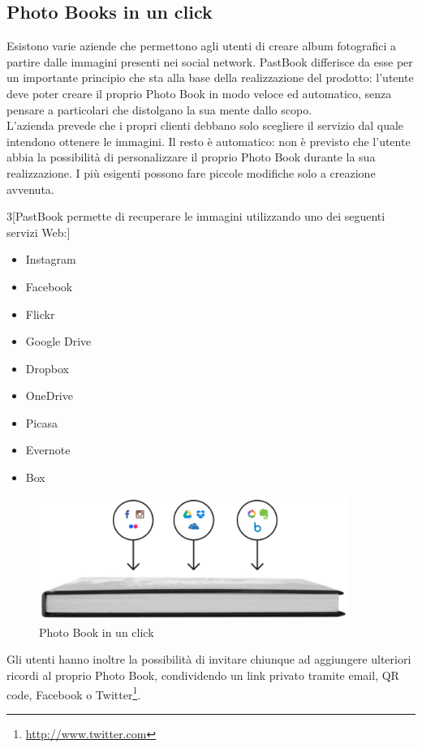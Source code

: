 		\subsection{Photo Books in un click}
			Esistono varie aziende che permettono agli utenti di creare album fotografici a partire dalle immagini presenti nei social
			network. PastBook differisce da esse per un importante principio che sta alla base della realizzazione del prodotto: l'utente
			deve poter creare il proprio Photo Book in modo veloce ed automatico, senza pensare a particolari che distolgano la sua mente
			dallo scopo.\\
			L'azienda prevede che i propri clienti debbano solo scegliere il servizio dal quale intendono ottenere le immagini. Il resto
			è automatico: non è previsto che l'utente abbia la possibilità di personalizzare il proprio Photo Book durante la sua
			realizzazione. I più esigenti possono fare piccole modifiche solo a creazione avvenuta.\\
			\begin{multicols}{3}[\noindent PastBook permette di recuperare le immagini utilizzando uno dei seguenti servizi Web:]
				\begin{itemize}
					\item Instagram
					\item Facebook
					\item Flickr
					\item Google Drive
					\item Dropbox
					\item OneDrive
					\item Picasa
					\item Evernote
					\item Box
				\end{itemize}
			\end{multicols}
			\begin{figure}[H]
				\centering
				\includegraphics[width=0.9\textwidth]{capitolo_1/immagini/photo_book_one_click.png}
				\caption[Photo Book in un click]{Photo Book in un click\protect\footnotemark}
			\end{figure}
			\noindent Gli utenti hanno inoltre la possibilità di invitare chiunque ad aggiungere ulteriori ricordi al proprio Photo Book,
			condividendo un link privato tramite email, QR code, Facebook o Twitter\footnote{\url{http://www.twitter.com}}.
